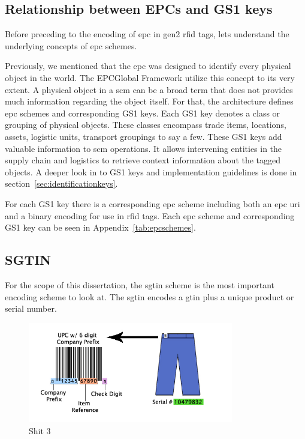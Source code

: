 \subsection{Relationship between EPCs and GS1 keys}

Before preceding to the encoding of \ac{epc} in \ac{gen2} \ac{rfid} tags, lets understand the underlying concepts of \ac{epc} schemes.

Previously, we mentioned that the \ac{epc} was designed to identify every physical object in the world.
The EPCGlobal Framework utilize this concept to its very extent.
A physical object in a \ac{scm} can be a broad term that does not provides much information regarding the object itself.
For that, the architecture defines \ac{epc} schemes and corresponding GS1 keys.
Each GS1 key denotes a class or grouping of physical objects. These classes encompass trade items, locations, assets, logistic units, transport groupings to say a few.
These GS1 keys add valuable information to \ac{scm} operations.
It allows intervening entities in the supply chain and logistics to retrieve context information about the tagged objects.
A deeper look in to GS1 keys and implementation guidelines is done in section~\ref{sec:identificationkeys}.

For each GS1 key there is a corresponding \ac{epc} scheme including both an \ac{epc} \ac{uri} and a binary encoding for use in \ac{rfid} tags.
Each \ac{epc} scheme and corresponding GS1 key can be seen in Appendix~\ref{tab:epcschemes}.

\subsection{SGTIN}

For the scope of this dissertation, the \ac{sgtin} scheme is the most important encoding scheme to look at.
The \ac{sgtin} encodes a \ac{gtin} plus a unique product or serial number.

\begin{figure}[!ht]
    \centering
    \includegraphics[width=0.8\textwidth]{./figs/02-state-of-the-art/SGTIN_UPC_Compare.jpg}
    \caption{Shit 3~\cite{SGTININFO}} 
    \label{fig:3333}
\end{figure}

